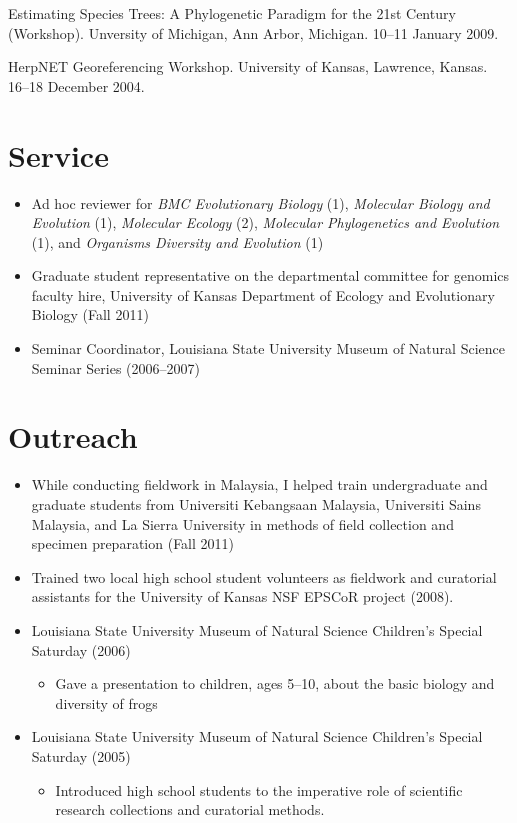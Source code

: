 \documentclass[10pt]{article}
\newenvironment{myItemize}{
  \begin{itemize}
    \setlength{\leftskip}{-4mm}
    \setlength{\itemsep}{0.25em}
    \setlength{\parskip}{0pt}
    \setlength{\parsep}{0.5em}}
  {\end{itemize}}
\newcommand{\myHangIndent}{\hangindent=5mm}
\begin{document}
\myHangIndent
Estimating Species Trees: A Phylogenetic Paradigm for the 21st Century
(Workshop).
Unversity of Michigan, Ann Arbor, Michigan.
10--11 January 2009.

\myHangIndent
HerpNET Georeferencing Workshop.
University of Kansas, Lawrence, Kansas.
16--18 December 2004.

\section*{Service}
\begin{myItemize}
\item Ad hoc reviewer for
    \emph{BMC Evolutionary Biology} (1),
    \emph{Molecular Biology and Evolution} (1),
    \emph{Molecular Ecology} (2),
    \emph{Molecular Phylogenetics and Evolution} (1), and
    \emph{Organisms Diversity and Evolution} (1)
\item Graduate student representative on the departmental committee for
    genomics faculty hire, University of Kansas Department of Ecology and
    Evolutionary Biology (Fall 2011)
\item Seminar Coordinator, Louisiana State University Museum of Natural Science
    Seminar Series (2006--2007)
\end{myItemize}

\section*{Outreach}
\begin{myItemize}
\item While conducting fieldwork in Malaysia, I helped train undergraduate and
    graduate students from Universiti Kebangsaan Malaysia, Universiti Sains
    Malaysia, and La Sierra University in methods of field collection and
    specimen preparation (Fall 2011)
\item Trained two local high school student volunteers as fieldwork and
    curatorial assistants for the University of Kansas NSF EPSCoR project
    (2008).
\item Louisiana State University Museum of Natural Science Children's Special
    Saturday (2006)
	\begin{myItemize}
        \item Gave a presentation to children, ages 5--10, about the basic
            biology and diversity of frogs
	\end{myItemize}
\item Louisiana State University Museum of Natural Science Children's Special
    Saturday (2005)
	\begin{myItemize}
        \item Introduced high school students to the imperative role of
            scientific research collections and curatorial methods.
	\end{myItemize}
\end{myItemize}
\end{document}
